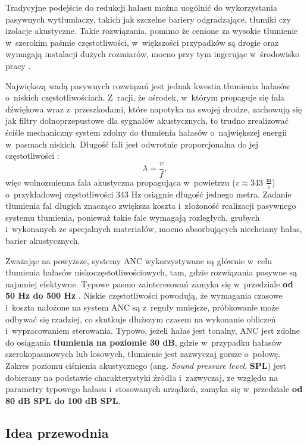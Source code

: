 Tradycyjne podejście do redukcji hałasu można uogólnić do wykorzystania
pasywnych wytłumiaczy, takich jak szczelne bariery odgradzające, tłumiki czy
izolacje akustyczne. Takie rozwiązania, pomimo że cenione za wysokie tłumienie
w~szerokim paśmie częstotliwości, w~większości przypadków są drogie oraz
wymagają instalacji dużych rozmiarów, mocno przy tym ingerując w~środowisko
pracy \cite{bib:kuo_morgan}. \par Największą wadą pasywnych rozwiązań jest
jednak kwestia tłumienia hałasów o~niskich częstotliwościach. Z~racji, że
ośrodek, w~którym propaguje się fala dźwiękowa wraz z~przeszkodami, które
napotyka na swojej drodze, zachowują się jak filtry dolnoprzepustowe dla
sygnałów akustycznych, to trudno zrealizować ściśle mechaniczny system zdolny do
tłumienia hałasów o~największej energii w~pasmach niskich. Długość fali jest
odwrotnie proporcjonalna do jej częstotliwości \cite{bib:resnick}:
\begin{equation}
    \lambda = \frac{v}{f},
\end{equation}
więc wolnozmienna fala akustyczna propagująca w~powietrzu ($v \approx 343$
$\frac{\text{m}}{\text{s}}$) o~przykładowej częstotliwości 343 Hz osiągnie
długość jednego metra. Zadanie tłumienia fal długich znacząco zwiększa koszta
i~złożoność realizacji pasywnego systemu tłumienia, ponieważ takie fale wymagają
rozległych, grubych i~wykonanych ze specjalnych materiałów, mocno absorbujących
niechciany hałas, barier akustycznych. \par Zważając na powyższe, systemy ANC
wykorzystywane są głównie w~celu tłumienia hałasów niskoczęstotliwościowych,
tam, gdzie rozwiązania pasywne są najmniej efektywne. Typowe pasmo zainteresowań
zamyka się w~przedziale \textbf{od 50 Hz do 500 Hz} \cite{bib:kuo_morgan}.
Niskie częstotliwości powodują, że wymagania czasowe i~koszta nałożone na system
ANC są z~reguły mniejsze, próbkowanie może odbywać się rzadziej, co skutkuje
dłuższym czasem na wykonanie obliczeń i~wypracowaniem sterowania. Typowo, jeżeli
hałas jest tonalny, ANC jest zdolne do osiągania \textbf{tłumienia na poziomie
30 dB}, gdzie w~przypadku hałasów szerokopasmowych lub losowych, tłumienie jest
zazwyczaj gorsze o~połowę. Zakres poziomu ciśnienia akustycznego (ang.
\textit{Sound pressure level}, \textbf{SPL}) jest dobierany na podstawie
charakterystyki źródła i~zazwyczaj, ze względu na parametry typowego hałasu
i~stosowanych urządzeń, zamyka się w~przedziale \textbf{od 80 dB SPL do 100 dB
SPL}.

\subsection{Idea przewodnia}

